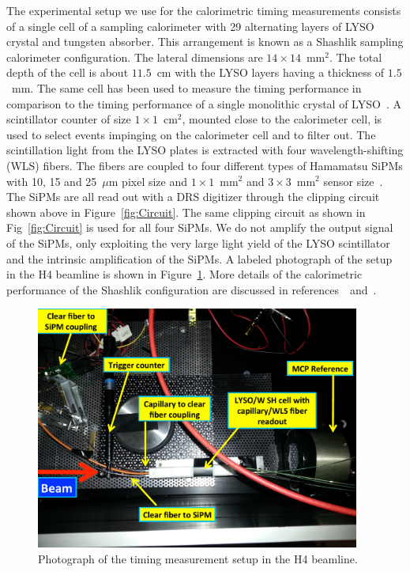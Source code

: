 The experimental setup we use for the calorimetric timing measurements consists
of a single cell of a sampling calorimeter with 29 alternating layers of LYSO
crystal and tungsten absorber. This arrangement is known as a Shashlik sampling
calorimeter configuration. The lateral dimensions are
$14\times14$~$\mathrm{mm}^{2}$. The total depth of the cell is about $11.5$~cm
with the LYSO layers having a thickness of $1.5$~mm. The same cell has been used
to measure the timing performance in comparison to the timing performance of a
single monolithic crystal of LYSO~\cite{Anderson:2015gha}. A scintillator
counter of size $1\times 1$~$\mathrm{cm}^{2}$, mounted close to the calorimeter
cell, is used to select events impinging on the calorimeter cell and to filter out. The
scintillation light from the LYSO plates is extracted with four
wavelength-shifting (WLS) fibers. The fibers are coupled to four different types
of Hamamatsu SiPMs with 10, 15 and 25~$\mu$m pixel size and $1\times
1$~$\mathrm{mm}^{2}$ and $3\times 3$~$\mathrm{mm}^{2}$ sensor
size~\cite{hamamatsuMPPC}. The SiPMs are all read out with a DRS digitizer
through the clipping circuit shown above in Figure~\ref{fig:Circuit}. The same
clipping circuit as shown in Fig~\ref{fig:Circuit} is used for all four SiPMs.
We do not amplify the output signal of the SiPMs, only exploiting the very large
light yield of the LYSO scintillator and the intrinsic amplification of the
SiPMs. A labeled photograph of the setup in the H4 beamline is shown in
Figure~\ref{fig:TestbeamSetup}. More details of the calorimetric
performance of the Shashlik configuration are discussed in
references~\cite{shashlik1}~and~\cite{shashlik2}.

\begin{figure}[htbp] 
\centering
\includegraphics[width=0.95\textwidth]{figures/ShashlikTBSetupDiagram} 
\caption{Photograph of the timing measurement setup in the H4 beamline.} 
\label{fig:TestbeamSetup} 
\end{figure} 

